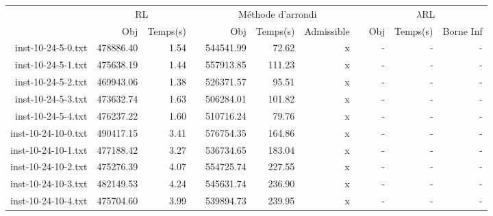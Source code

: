 \begin{landscape}

\begin{table*}[h!]\centering
{}
\begin{tabular}{@{}rrrcrrrcrrr@{}}\toprule
& \multicolumn{2}{c}{RL} & \phantom{abc} & \multicolumn{3}{c}{Méthode d'arrondi} & \phantom{abc} & \multicolumn{3}{c}{$\lambda$RL}\\
\cmidrule{2-3} \cmidrule{5-7} \cmidrule{9-11}
& Obj & Temps(s) & & Obj & Temps(s) & Admissible & & Obj & Temps(s) & Borne Inf\\ \midrule

inst-10-24-5-0.txt & 478886.40 & 1.54 & & 544541.99 & 72.62 & x & & - & - & - \\
inst-10-24-5-1.txt & 475638.19 & 1.44 & & 557913.85 & 111.23 & x & & - & - & - \\
inst-10-24-5-2.txt & 469943.06 & 1.38 & & 526371.57 & 95.51 & x & & - & - & - \\
inst-10-24-5-3.txt & 473632.74 & 1.63 & & 506284.01 & 101.82 & x & & - & - & - \\
inst-10-24-5-4.txt & 476237.22 & 1.60 & & 510716.24 & 79.76 & x & & - & - & - \\
inst-10-24-10-0.txt & 490417.15 & 3.41 & & 576754.35 & 164.86 & x & & - & - & - \\
inst-10-24-10-1.txt & 477188.42 & 3.27 & & 536734.65 & 183.04 & x & & - & - & - \\
inst-10-24-10-2.txt & 475276.39 & 4.07 & & 554725.74 & 227.55 & x & & - & - & - \\
inst-10-24-10-3.txt & 482149.53 & 4.24 & & 545631.74 & 236.90 & x & & - & - & - \\
inst-10-24-10-4.txt & 475704.60 & 3.99 & & 539894.73 & 239.95 & x & & - & - & - \\

\end{tabular}
\end{table*}

\end{landscape}